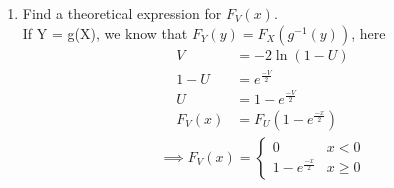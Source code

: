 \documentclass[journal,12pt,twocolumn]{IEEEtran}
\renewcommand\thesection{\arabic{section}}
\begin{document}
\begin{enumerate}[label=\thesection.\arabic*
,ref=\thesection.\theenumi]
\begin{figure}[!h]
\caption{The CDF of $V$}
\label{fig:3.1}
\end{figure}
\item Find a theoretical expression for $F_V(x)$.\\
\solution
If Y = g(X), we know that $F_Y(y) = F_X(g^{-1}(y))$, here 
\begin{align}
V &= -2\ln{(1-U)} \\
1-U &= e^{\frac{-V}{2}}\\
U &= 1 - e^{\frac{-V}{2}} \\ 
F_V(x) &= F_U(1 - e^{\frac{-x}{2}}) 
\end{align}
 \begin{align}
\implies
  F_V(x)=
  \begin{cases}
   0                         & x < 0 \\
	1 - e^{\frac{-x}{2}} & x \geq 0
	\end{cases}
 \end{align}
\end{enumerate}
\end{document}
